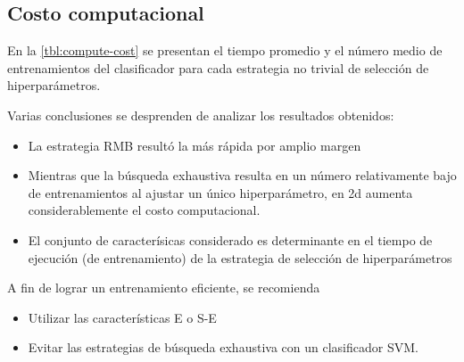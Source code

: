 \documentclass[12pt,bibliography=oldstyle,DIV=12,parskip=half-]{scrreprt}
\begin{document}
\subsection{Costo computacional}
%
En la \autoref{tbl:compute-cost} se presentan el tiempo promedio y el
número medio de entrenamientos del clasificador para cada estrategia
no trivial de selección de hiperparámetros.

Varias conclusiones se desprenden de analizar los resultados
obtenidos:
%
\begin{itemize}
\item La estrategia RMB resultó la más rápida por amplio margen
\item Mientras que la búsqueda exhaustiva resulta en un número
  relativamente bajo de entrenamientos al ajustar un único
  hiperparámetro, en 2d aumenta considerablemente el costo
  computacional.
\item El conjunto de caracterísicas considerado es determinante en el
  tiempo de ejecución (de entrenamiento) de la estrategia de selección
  de hiperparámetros
\end{itemize}
%
A fin de lograr un entrenamiento eficiente, se recomienda
%
\begin{itemize}
\item Utilizar las características E o S-E
\item Evitar las estrategias de búsqueda exhaustiva con un
  clasificador SVM.
\end{itemize}
%
\end{document}
